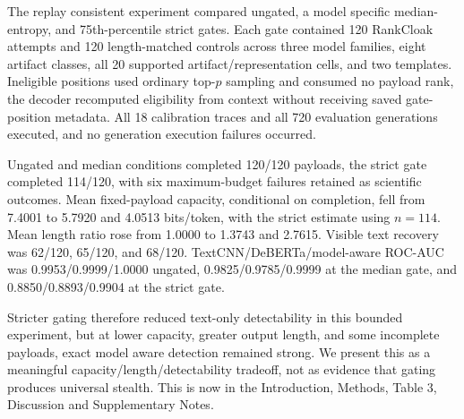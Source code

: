 \documentclass[11pt]{article}
\begin{document}
The replay consistent experiment compared ungated, a model specific median-entropy, and 75th-percentile strict gates. Each gate contained 120 RankCloak attempts and 120 length-matched controls across three model families, eight artifact classes, all 20 supported artifact/representation cells, and two templates. Ineligible positions used ordinary top-\(p\) sampling and consumed no payload rank, the decoder recomputed eligibility from context without receiving saved gate-position metadata. All 18 calibration traces and all 720 evaluation generations executed, and no generation execution failures occurred.

Ungated and median conditions completed 120/120 payloads, the strict gate completed 114/120, with six maximum-budget failures retained as scientific outcomes. Mean fixed-payload capacity, conditional on completion, fell from 7.4001 to 5.7920 and 4.0513 bits/token, with the strict estimate using \(n=114\). Mean length ratio rose from 1.0000 to 1.3743 and 2.7615. Visible text recovery was 62/120, 65/120, and 68/120. TextCNN/DeBERTa/model-aware ROC-AUC was 0.9953/0.9999/1.0000 ungated, 0.9825/0.9785/0.9999 at the median gate, and 0.8850/0.8893/0.9904 at the strict gate.

Stricter gating therefore reduced text-only detectability in this bounded experiment, but at lower capacity, greater output length, and some incomplete payloads, exact model aware detection remained strong. We present this as a meaningful capacity/length/detectability tradeoff, not as evidence that gating produces universal stealth.
This is now in the Introduction, Methods, Table 3, Discussion and Supplementary Notes.
\end{document}

